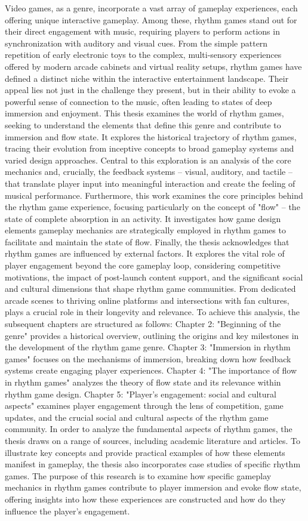 Video games, as a genre, incorporate a vast array of gameplay experiences, each offering unique interactive gameplay. Among these, rhythm games stand out for their direct engagement with music, requiring players to perform actions in synchronization with auditory and visual cues. From the simple pattern repetition of early electronic toys to the complex, multi-sensory experiences offered by modern arcade cabinets and virtual reality setups, rhythm games have defined a distinct niche within the interactive entertainment landscape. Their appeal lies not just in the challenge they present, but in their ability to evoke a powerful sense of connection to the music, often leading to states of deep immersion and enjoyment.
This thesis examines the world of rhythm games, seeking to understand the elements that define this genre and contribute to immersion and flow state. It explores the historical trajectory of rhythm games, tracing their evolution from inceptive concepts to broad gameplay systems and varied design approaches. Central to this exploration is an analysis of the core mechanics and, crucially, the feedback systems -- visual, auditory, and tactile -- that translate player input into meaningful interaction and create the feeling of musical performance.
Furthermore, this work examines the core principles behind the rhythm game experience, focusing particularly on the concept of "flow" -- the state of complete absorption in an activity. It investigates how game design elements  gameplay mechanics are strategically employed in rhythm games to facilitate and maintain the state of flow.
Finally, the thesis acknowledges that rhythm games are influenced by external factors. It explores the vital role of player engagement beyond the core gameplay loop, considering competitive motivations, the impact of post-launch content support, and the significant social and cultural dimensions that shape rhythm game communities. From dedicated arcade scenes to thriving online platforms and intersections with fan cultures, plays a crucial role in their longevity and relevance. 
To achieve this analysis, the subsequent chapters are structured as follows: Chapter 2: "Beginning of the genre" provides a historical overview, outlining the origins and key milestones in the development of the rhythm game genre. Chapter 3: "Immersion in rhythm games" focuses on the mechanisms of immersion, breaking down how feedback systems create engaging player experiences. Chapter 4: "The importance of flow in rhythm games" analyzes the theory of flow state and its relevance within rhythm game design. Chapter 5: "Player's engagement: social and cultural aspects" examines player engagement through the lens of competition, game updates, and the crucial social and cultural aspects of the rhythm game community.
In order to analyze the fundamental aspects of rhythm games, the thesis draws on a range of sources, including academic literature and articles. To illustrate key concepts and provide practical examples of how these elements manifest in gameplay, the thesis also incorporates case studies of specific rhythm games.
The purpose of this research is to examine how specific gameplay mechanics in rhythm games contribute to player immersion and evoke flow state, offering insights into how these experiences are constructed and how do they influence the player's engagement.